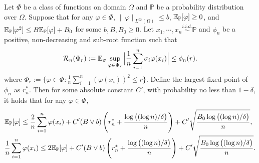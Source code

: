 \documentclass[11pt]{article}
\numberwithin{equation}{section}
\renewcommand{\P}{\mathbb{P}}
\begin{document}
\begin{lemma}\label{lem:local_rademacher}
    Let $\Phi$ be a class of functions on domain $\Omega$ and $\P$ be a probability distribution over $\Omega$. 
    Suppose that for any $\varphi\in\Phi$, $\|\varphi\|_{L^\infty(\Omega)}\leq b$, $\E_\P [\varphi]\geq 0$, and $\E_\P [\varphi^2] \leq B\E_\P [\varphi]+B_0$ for some $b,B,B_0\geq 0$. 
    Let $x_1,\cdots,x_n\overset{\textit{i.i.d.}}{\sim}\P$ and $\phi_n$ be a positive, non-decreasing and sub-root function such that
    \begin{equation}
        \mathcal{R}_n(\Phi_r):=\mathbb{E}_{\bm{\sigma}} \sup_{\varphi\in\Phi_r}\Big|\frac{1}{n}\sum_{i=1}^n\sigma_i\varphi(x_i)\Big|\leq \phi_n(r).
    \end{equation}
    where $\Phi_r:= \Big\{\varphi\in\Phi: \frac{1}{n}\sum_{i=1}^n{(\varphi(x_i))^2}\leq r\Big\}$.
    Define the largest fixed point of $\phi_n$ as $r_n^*$.
    Then for some absolute constant $C'$, with probability no less than $1-\delta$, it holds that for any $\varphi\in\Phi$,
    \begin{align}
        &\E_\P[\varphi]\leq \frac{2}{n}\sum_{i=1}^n\varphi(x_i) + C'(B\vee b)\left(r_n^* + \frac{\log\big((\log n)/\delta\big)}{n}\right)+C'\sqrt{\frac{B_0\log\big((\log n)/\delta\big)}{n}},\\
        &\frac{1}{n}\sum_{i=1}^n\varphi(x_i)\leq 2\E_\P[\varphi] + C'(B\vee b)\left(r_n^* + \frac{\log\big((\log n)/\delta\big)}{n}\right)+C'\sqrt{\frac{B_0\log\big((\log n)/\delta\big)}{n}}. 
    \end{align}
\end{lemma}
\end{document}
